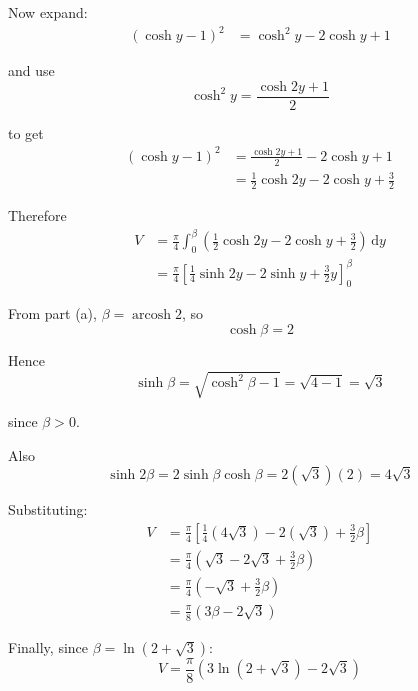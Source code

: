\documentclass[leqno]{article}
\begin{document}
\begin{enumerate}[
  label=\textbf{\arabic*.},
  leftmargin=*,
  topsep=0pt,
  partopsep=0pt,
  parsep=0pt
]
\begin{djsSolution}
\begin{enumerate}[label=\textbf{(\alph*)}]
Now expand:
\begin{align*}
(\cosh y-1)^2
&=\cosh^2 y-2\cosh y+1
\end{align*}

and use
\[
\cosh^2 y=\frac{\cosh 2y+1}{2}
\]

to get
\begin{align*}
(\cosh y-1)^2
&=\frac{\cosh 2y+1}{2}-2\cosh y+1 \\
&=\frac12\cosh 2y-2\cosh y+\frac32
\end{align*}

Therefore
\begin{align*}
V
&=\frac{\pi}{4}\int_0^\beta \left(\frac12\cosh 2y-2\cosh y+\frac32\right)\,\mathrm{d}y \\
&=\frac{\pi}{4}\left[\frac14\sinh 2y-2\sinh y+\frac32 y\right]_0^\beta
\end{align*}

From part (a), $\beta=\operatorname{arcosh}2$, so
\[
\cosh\beta=2
\]

Hence
\[
\sinh\beta=\sqrt{\cosh^2\beta-1}=\sqrt{4-1}=\sqrt3
\]

since $\beta>0$.

Also
\[
\sinh 2\beta=2\sinh\beta\cosh\beta=2(\sqrt3)(2)=4\sqrt3
\]

Substituting:
\begin{align*}
V
&=\frac{\pi}{4}\left[\frac14(4\sqrt3)-2(\sqrt3)+\frac32\beta\right] \\
&=\frac{\pi}{4}\left(\sqrt3-2\sqrt3+\frac32\beta\right) \\
&=\frac{\pi}{4}\left(-\sqrt3+\frac32\beta\right) \\
&=\frac{\pi}{8}(3\beta-2\sqrt3)
\end{align*}

Finally, since $\beta=\ln(2+\sqrt3)$:
\[
V=\frac{\pi}{8}\left(3\ln(2+\sqrt3)-2\sqrt3\right)
\]
\end{enumerate}
\end{djsSolution}

\newpage
\questionitem

\begin{figure}[H]
    \centering
{}
\end{figure}



\end{enumerate}
\end{document}
